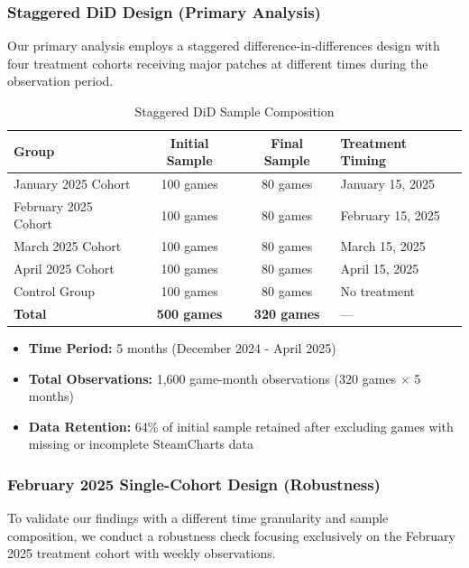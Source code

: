 \documentclass[12pt,a4paper]{article}
\begin{document}
\subsubsection{Staggered DiD Design (Primary Analysis)}

Our primary analysis employs a staggered difference-in-differences design with four treatment cohorts receiving major patches at different times during the observation period.

\begin{table}[H]
\centering
\caption{Staggered DiD Sample Composition}
\begin{tabular}{lccl}
\toprule
\textbf{Group} & \textbf{Initial Sample} & \textbf{Final Sample} & \textbf{Treatment Timing} \\
\midrule
January 2025 Cohort & 100 games & 80 games & January 15, 2025 \\
February 2025 Cohort & 100 games & 80 games & February 15, 2025 \\
March 2025 Cohort & 100 games & 80 games & March 15, 2025 \\
April 2025 Cohort & 100 games & 80 games & April 15, 2025 \\
Control Group & 100 games & 80 games & No treatment \\
\midrule
\textbf{Total} & \textbf{500 games} & \textbf{320 games} & --- \\
\bottomrule
\end{tabular}
\end{table}

\begin{itemize}
    \item \textbf{Time Period:} 5 months (December 2024 - April 2025)
    \item \textbf{Total Observations:} 1,600 game-month observations (320 games $\times$ 5 months)
    \item \textbf{Data Retention:} 64\% of initial sample retained after excluding games with missing or incomplete SteamCharts data
\end{itemize}

\subsubsection{February 2025 Single-Cohort Design (Robustness)}

To validate our findings with a different time granularity and sample composition, we conduct a robustness check focusing exclusively on the February 2025 treatment cohort with weekly observations.
\end{document}
